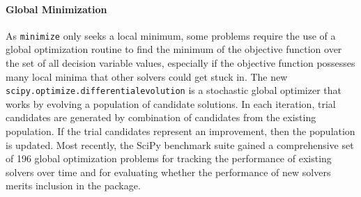 \paragraph{Global Minimization}
As \texttt{minimize} only seeks a local minimum, some problems require the use of a global optimization routine to find the minimum of the objective function over the set of all decision variable values, especially if the objective function possesses many local minima that other solvers could get stuck in. The new \texttt{scipy.optimize.differential\textunderscore evolution} \cite{Wormington1999,Storn1997} is a stochastic global optimizer that works by evolving a population of candidate solutions. In each iteration, trial candidates are generated by combination of candidates from the existing population. If the trial candidates represent an improvement, then the population is updated. Most recently, the SciPy benchmark suite gained a comprehensive set of 196 global optimization problems for tracking the performance of existing solvers over time and for evaluating whether the performance of new solvers merits inclusion in the package. 
